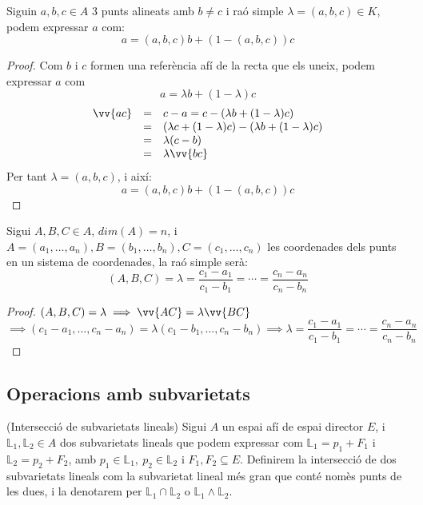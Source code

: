\begin{prop}
	Siguin $a,b,c\in A$ 3 punts alineats amb $b\neq c$ i raó simple $\lambda =(a,b,c)\in K$, podem expressar $a$ com:
	$$a=(a,b,c)b+(1-(a,b,c))c$$
\end{prop}
\begin{proof}
	Com $b$ i $c$ formen una referència afí de la recta que els uneix, podem expressar $a$ com
	\[a=\lambda b+(1-\lambda)c\]
	$$\begin{array}{rcl}
		\vv{ac} & = & c-a=c-(\lambda b+(1-\lambda )c)                      \\
		        & = & (\lambda c +(1-\lambda )c)-(\lambda b+(1-\lambda )c) \\
		        & = & \lambda (c-b)                                        \\
		        & = & \lambda \vv{bc}                                      \\
	\end{array}$$
	Per tant $\lambda =(a,b,c)$, i així:
	$$a=(a,b,c)b+(1-(a,b,c))c$$	
\end{proof}

\begin{prop}
	Sigui $A,B,C\in A$, $dim(A)=n$, i $A=(a_1,\dotsc ,a_n),B=(b_1,\dotsc ,b_n),C=(c_1,\dotsc ,c_n)$ les coordenades dels punts en un sistema de coordenades, la raó simple serà: \\
	\[(A,B,C)=\lambda =\frac{c_1-a_1}{c_1-b_1}=\dotsb =\frac{c_n-a_n}{c_n-b_n}\]
\end{prop}
\begin{proof}
	$(A,B,C)=\lambda\implies\vv{AC}=\lambda\vv{BC}$ \\
	\[\implies (c_1-a_1,\dotsc ,c_n-a_n)=\lambda (c_1-b_1,\dotsc ,c_n-b_n)\implies\lambda=\frac{c_1-a_1}{c_1-b_1}=\dotsb =\frac{c_n-a_n}{c_n-b_n}\]
\end{proof}

\subsection{Operacions amb subvarietats}
\label{ss_opsvar}

\begin{defn}(Intersecció de subvarietats lineals)
	Sigui $A$ un espai afí de espai director $E$, i $\mathbb{L}_1,\mathbb{L}_2\in A$ dos subvarietats lineals que podem expressar com $\mathbb{L}_1=p_1+F_1$ i $\mathbb{L}_2=p_2+F_2$, amb $p_1\in\mathbb{L}_1,\: p_2\in\mathbb{L}_2$ i $F_1,F_2\subseteq E$. Definirem la intersecció de dos subvarietats lineals com la subvarietat lineal més gran que conté nomès punts de les dues, i la denotarem per $\mathbb{L}_1\cap\mathbb{L}_2$ o $\mathbb{L}_1\land\mathbb{L}_2$.
\end{defn}

